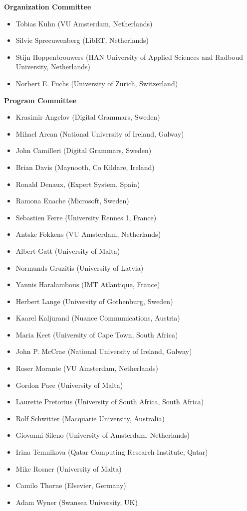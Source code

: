 \documentclass[11pt,a4paper]{article}
\begin{document}
\begin{center}
  {\Large \textbf{Organization Committee}}
\end{center}

\begin{itemize}
\item Tobias Kuhn (VU Amsterdam, Netherlands)
\item Silvie Spreeuwenberg (LibRT, Netherlands)
\item Stijn Hoppenbrouwers (HAN University of Applied Sciences and Radboud University, Netherlands)
\item Norbert E. Fuchs (University of Zurich, Switzerland)
\end{itemize}

\begin{center}
  {\Large \textbf{Program Committee}}
\end{center}

\begin{itemize}
\item Krasimir Angelov (Digital Grammars, Sweden)
\item Mihael Arcan (National University of Ireland, Galway)
\item John Camilleri (Digital Grammars, Sweden)
\item Brian Davis (Maynooth, Co Kildare, Ireland)
\item Ronald Denaux, (Expert System, Spain)
\item Ramona Enache (Microsoft, Sweden)
\item Sebastien Ferre (University Rennes 1, France)
\item Antske Fokkens (VU Amsterdam, Netherlands)
\item Albert Gatt (University of Malta)
\item Normunds Gruzitis (University of Latvia)
\item Yannis Haralambous (IMT Atlantique, France)
\item Herbert Lange (University of Gothenburg, Sweden)
\item Kaarel Kaljurand (Nuance Communications, Austria)
\item Maria Keet (University of Cape Town, South Africa)
\item John P. McCrae (National University of Ireland, Galway)
\item Roser Morante (VU Amsterdam, Netherlands)
\item Gordon Pace (University of Malta)
\item Laurette Pretorius (University of South Africa, South Africa)
\item Rolf Schwitter (Macquarie University, Australia)
\item Giovanni Sileno (University of Amsterdam, Netherlands)
\item Irina Temnikova (Qatar Computing Research Institute, Qatar)
\item Mike Rosner (University of Malta)
\item Camilo Thorne (Elsevier, Germany)
\item Adam Wyner (Swansea University, UK)
\end{itemize}
\end{document}
